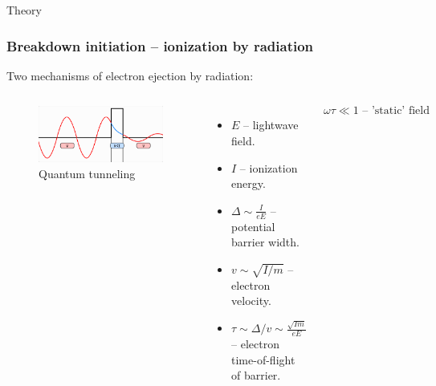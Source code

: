 \documentclass{beamer}
\begin{document}
	
	\begin{frame}[plain,c]
		
		\begin{center}
			\huge {} Theory
		\end{center}
		
	\end{frame}
	
	\begin{frame}
		\frametitle{Breakdown initiation -- ionization by radiation}
		\vspace{-5pt}
		Two mechanisms of electron ejection by radiation:
		\begin{columns}
			\begin{figure}
				\centering
				\includegraphics[width=\linewidth]{res/tunneling.png}
				\caption*{Quantum tunneling}
			\end{figure}
			\vspace{-10pt}
			\footnotesize
			\begin{itemize}
				\setlength\itemsep{-2pt}
				\item $E$ -- lightwave field.
				\item $I$ -- ionization energy.
				\item $\Delta \sim \frac{I}{eE}$ -- potential barrier width.
				\item $v \sim \sqrt{I/m}$ -- electron velocity.
				\item $\tau \sim \Delta / v \sim \frac{\sqrt{Im}}{eE}$ -- electron time-of-flight of barrier.
			\end{itemize}
			$$\omega \tau \ll 1 \text{ -- 'static' field condition.}$$
			

\end{columns}
\end{frame}
\end{document}
